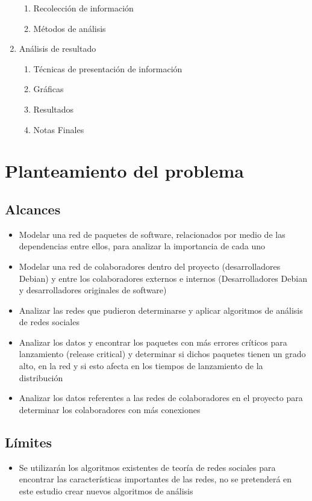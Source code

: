\documentclass[letterpaper,12pt,titlepage]{report}
\begin{document}
\begin{enumerate}
\begin{enumerate}
  \item Recolección de información
  \item Métodos de análisis
  \end{enumerate}
\item Análisis de resultado
  \begin{enumerate}
  \item Técnicas de presentación de información
  \item Gráficas
  \item Resultados
  \item Notas Finales
  \end{enumerate}
\end{enumerate}

\chapter{Planteamiento del problema}
\section*{Alcances}
\begin{itemize}
\item Modelar una red de paquetes de software, relacionados por medio de las dependencias entre ellos, para analizar la importancia de cada uno
\item Modelar una red de colaboradores dentro del proyecto
  (desarrolladores Debian) y entre los colaboradores externos e
  internos (Desarrolladores Debian y desarrolladores originales de
  software)
\item Analizar las redes que pudieron determinarse y aplicar
  algoritmos de análisis de redes sociales
\item Analizar los datos y encontrar los paquetes con más errores
  críticos para lanzamiento (release critical) y determinar si dichos
  paquetes tienen un grado alto, en la red y si esto afecta en los
  tiempos de lanzamiento de la distribución
\item Analizar los datos referentes a las redes de colaboradores en el
  proyecto para determinar los colaboradores con más conexiones
\end{itemize}
\section*{Límites}
\begin{itemize}
\item Se utilizarán los algoritmos existentes de teoría de redes
  sociales para encontrar las características importantes de las
  redes, no se pretenderá en este estudio crear nuevos algoritmos de
  análisis
\end{itemize}
\end{document}

